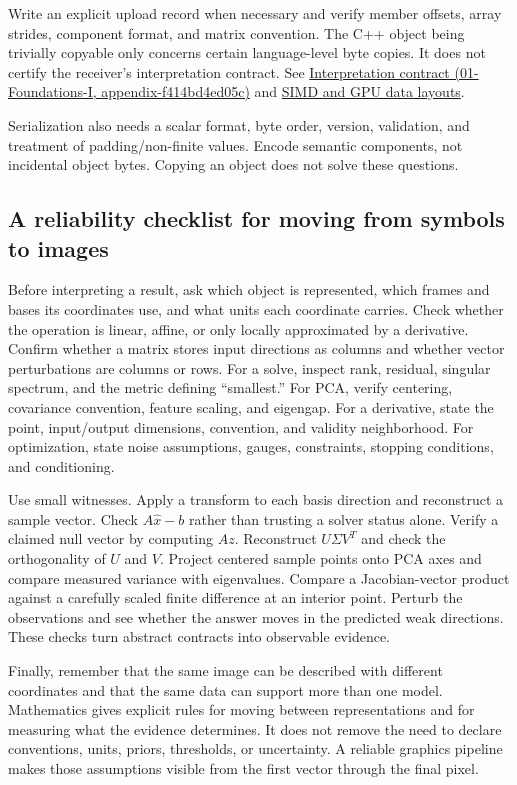 Write an explicit upload record when necessary and verify member offsets, array strides, component format, and matrix convention. The C++ object being trivially copyable only concerns certain language-level byte copies. It does not certify the receiver's interpretation contract. See \href{}{Interpretation contract (01-Foundations-I, appendix-f414bd4ed05c)} and \hyperref[appendix-3c7b1a56de01]{SIMD and GPU data layouts}.

Serialization also needs a scalar format, byte order, version, validation, and treatment of padding/non-finite values. Encode semantic components, not incidental object bytes. Copying an object does not solve these questions.

\subsection{A reliability checklist for moving from symbols to images}\label{a-reliability-checklist-for-moving-from-symbols-to-images}

Before interpreting a result, ask which object is represented, which frames and bases its coordinates use, and what units each coordinate carries. Check whether the operation is linear, affine, or only locally approximated by a derivative. Confirm whether a matrix stores input directions as columns and whether vector perturbations are columns or rows. For a solve, inspect rank, residual, singular spectrum, and the metric defining ``smallest.'' For PCA, verify centering, covariance convention, feature scaling, and eigengap. For a derivative, state the point, input/output dimensions, convention, and validity neighborhood. For optimization, state noise assumptions, gauges, constraints, stopping conditions, and conditioning.

Use small witnesses. Apply a transform to each basis direction and reconstruct a sample vector. Check \(A\hat x-b\) rather than trusting a solver status alone. Verify a claimed null vector by computing \(Az\). Reconstruct \(U\Sigma V^T\) and check the orthogonality of \(U\) and \(V\). Project centered sample points onto PCA axes and compare measured variance with eigenvalues. Compare a Jacobian-vector product against a carefully scaled finite difference at an interior point. Perturb the observations and see whether the answer moves in the predicted weak directions. These checks turn abstract contracts into observable evidence.

Finally, remember that the same image can be described with different coordinates and that the same data can support more than one model. Mathematics gives explicit rules for moving between representations and for measuring what the evidence determines. It does not remove the need to declare conventions, units, priors, thresholds, or uncertainty. A reliable graphics pipeline makes those assumptions visible from the first vector through the final pixel.

